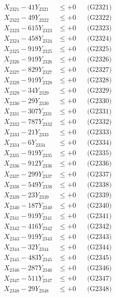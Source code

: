\documentclass[a4paper,10pt]{article}
\begin{document}
{\begin{align}
\allowbreak
X_{2321} - 41Y_{2321} &\leq +0 && \text{(G2321)} \\
X_{2322} - 49Y_{2322} &\leq +0 && \text{(G2322)} \\
X_{2323} - 615Y_{2323} &\leq +0 && \text{(G2323)} \\
X_{2324} - 458Y_{2324} &\leq +0 && \text{(G2324)} \\
X_{2325} - 919Y_{2325} &\leq +0 && \text{(G2325)} \\
X_{2326} - 919Y_{2326} &\leq +0 && \text{(G2326)} \\
X_{2327} - 829Y_{2327} &\leq +0 && \text{(G2327)} \\
X_{2328} - 919Y_{2328} &\leq +0 && \text{(G2328)} \\
X_{2329} - 34Y_{2329} &\leq +0 && \text{(G2329)} \\
X_{2330} - 29Y_{2330} &\leq +0 && \text{(G2330)} \\
\allowbreak
X_{2331} - 307Y_{2331} &\leq +0 && \text{(G2331)} \\
X_{2332} - 787Y_{2332} &\leq +0 && \text{(G2332)} \\
X_{2333} - 21Y_{2333} &\leq +0 && \text{(G2333)} \\
X_{2334} - 6Y_{2334} &\leq +0 && \text{(G2334)} \\
X_{2335} - 919Y_{2335} &\leq +0 && \text{(G2335)} \\
X_{2336} - 912Y_{2336} &\leq +0 && \text{(G2336)} \\
X_{2337} - 299Y_{2337} &\leq +0 && \text{(G2337)} \\
X_{2338} - 549Y_{2338} &\leq +0 && \text{(G2338)} \\
X_{2339} - 23Y_{2339} &\leq +0 && \text{(G2339)} \\
X_{2340} - 187Y_{2340} &\leq +0 && \text{(G2340)} \\
\allowbreak
X_{2341} - 919Y_{2341} &\leq +0 && \text{(G2341)} \\
X_{2342} - 416Y_{2342} &\leq +0 && \text{(G2342)} \\
X_{2343} - 919Y_{2343} &\leq +0 && \text{(G2343)} \\
X_{2344} - 32Y_{2344} &\leq +0 && \text{(G2344)} \\
X_{2345} - 483Y_{2345} &\leq +0 && \text{(G2345)} \\
X_{2346} - 287Y_{2346} &\leq +0 && \text{(G2346)} \\
X_{2347} - 511Y_{2347} &\leq +0 && \text{(G2347)} \\
X_{2348} - 29Y_{2348} &\leq +0 && \text{(G2348)} \\

\end{align}}
\end{document}

